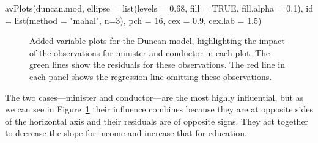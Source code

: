 \documentclass[
  letterpaper,
  10pt,
  krantz2]{krantz}
\makeatletter
\newenvironment{Shaded}{\begin{snugshade}}{\end{snugshade}}
\newcommand{\AttributeTok}[1]{\textcolor[rgb]{0.40,0.45,0.13}{#1}}
\newcommand{\ConstantTok}[1]{\textcolor[rgb]{0.56,0.35,0.01}{#1}}
\newcommand{\DecValTok}[1]{\textcolor[rgb]{0.68,0.00,0.00}{#1}}
\newcommand{\FloatTok}[1]{\textcolor[rgb]{0.68,0.00,0.00}{#1}}
\newcommand{\FunctionTok}[1]{\textcolor[rgb]{0.28,0.35,0.67}{#1}}
\newcommand{\NormalTok}[1]{\textcolor[rgb]{0.00,0.23,0.31}{#1}}
\newcommand{\StringTok}[1]{\textcolor[rgb]{0.13,0.47,0.30}{#1}}
\newenvironment{kframe}{%
  \medskip{}
  \setlength{\fboxsep}{.8em}
  \def\at@end@of@kframe{}%
  \ifinner\ifhmode%
  \def\at@end@of@kframe{\end{minipage}}%
  \begin{minipage}{\columnwidth}%
  \fi\fi%
  \def\FrameCommand##1{\hskip\@totalleftmargin \hskip-\fboxsep
  \colorbox{shadecolor}{##1}\hskip-\fboxsep
      \hskip-\linewidth \hskip-\@totalleftmargin \hskip\columnwidth}%
  \MakeFramed {\advance\hsize-\width
    \@totalleftmargin\z@ \linewidth\hsize
    \@setminipage}}%
{\par\unskip\endMakeFramed%
  \at@end@of@kframe}
\renewenvironment{Shaded}{\begin{kframe}}{\end{kframe}}
\makeatother
\begin{document}
\begin{Shaded}
\begin{Highlighting}[]
\FunctionTok{avPlots}\NormalTok{(duncan.mod,}
  \AttributeTok{ellipse =} \FunctionTok{list}\NormalTok{(}\AttributeTok{levels =} \FloatTok{0.68}\NormalTok{, }\AttributeTok{fill =} \ConstantTok{TRUE}\NormalTok{, }\AttributeTok{fill.alpha =} \FloatTok{0.1}\NormalTok{),}
  \AttributeTok{id =} \FunctionTok{list}\NormalTok{(}\AttributeTok{method =} \StringTok{"mahal"}\NormalTok{, }\AttributeTok{n=}\DecValTok{3}\NormalTok{),}
  \AttributeTok{pch =} \DecValTok{16}\NormalTok{, }\AttributeTok{cex =} \FloatTok{0.9}\NormalTok{,}
  \AttributeTok{cex.lab =} \FloatTok{1.5}\NormalTok{)}
\end{Highlighting}
\end{Shaded}

\begin{figure}


\caption{\label{fig-duncan-av-influence}Added variable plots for the
Duncan model, highlighting the impact of the observations for minister
and conductor in each plot. The green lines show the residuals for these
observations. The red line in each panel shows the regression line
omitting these observations.}

\end{figure}%

The two cases---minister and conductor---are the most highly
influential, but as we can see in Figure~\ref{fig-duncan-av-influence}
their influence combines because they are at opposite sides of the
horizontal axis and their residuals are of opposite signs. They act
together to decrease the slope for income and increase that for
education.
\end{document}
